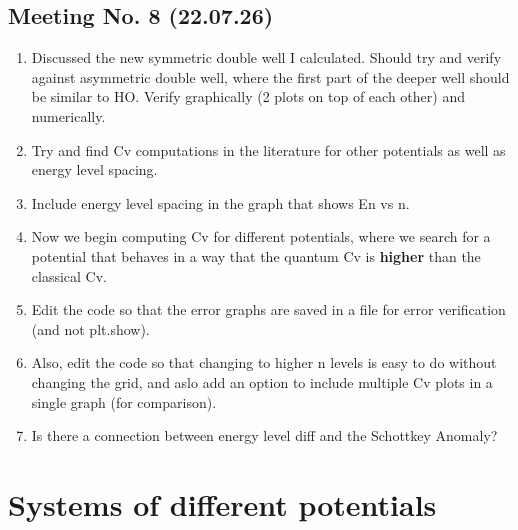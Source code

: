 \documentclass{article}
\numberwithin{equation}{subsection}
\begin{document}
\subsection*{Meeting No. 8 (22.07.26)}
\begin{enumerate}[label=\textbf{\Alph*.}]
    \item Discussed the new symmetric double well I calculated. Should try and verify against asymmetric double well, where the first part of the deeper well should be similar to HO. Verify graphically (2 plots on top of each other) and numerically.
    \item Try and find Cv computations in the literature for other potentials as well as energy level spacing.
    \item Include energy level spacing in the graph that shows En vs n. 
    \item Now we begin computing Cv for different potentials, where we search for a potential that behaves in a way that the quantum Cv is \textbf{higher} than the classical Cv.
    \item Edit the code so that the error graphs are saved in a file for error verification (and not plt.show).
    \item Also, edit the code so that changing to higher n levels is easy to do without changing the grid, and aslo add an option to include multiple Cv plots in a single graph (for comparison).
    \item Is there a connection between energy level diff and the Schottkey Anomaly?
\end{enumerate}
\section{Systems of different potentials}
\end{document}
